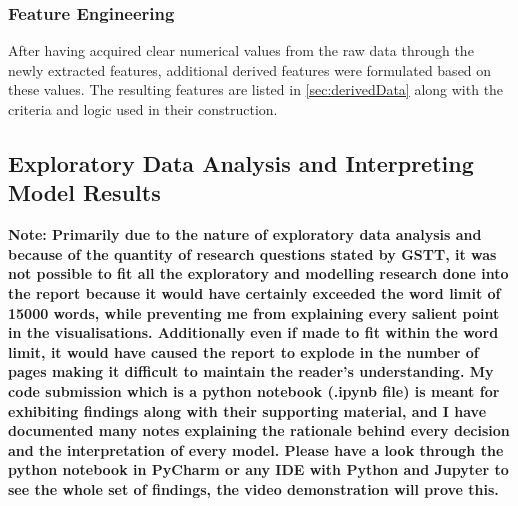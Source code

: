 \subsubsection{Feature Engineering}
\noindent After having acquired clear numerical values from the raw data through the newly extracted features, additional derived features were formulated based on these values. The resulting features are listed in \autoref{sec:derivedData} along with the criteria and logic used in their construction.   

\subsection{Exploratory Data Analysis and Interpreting Model Results}

\noindent \textbf{Note: Primarily due to the nature of exploratory data analysis and because of the quantity of research questions stated by GSTT, it was not possible to fit all the exploratory and modelling research done into the report because it would have certainly exceeded the word limit of 15000 words, while preventing me from explaining every salient point in the visualisations. Additionally even if made to fit within the word limit, it would have caused the report to explode in the number of pages making it difficult to maintain the reader's understanding. My code submission which is a python notebook (.ipynb file) is meant for exhibiting findings along with their supporting material, and I have documented many notes explaining the rationale behind every decision and the interpretation of every model. Please have a look through the python notebook in PyCharm or any IDE with Python and Jupyter to see the whole set of findings, the video demonstration will prove this.}



